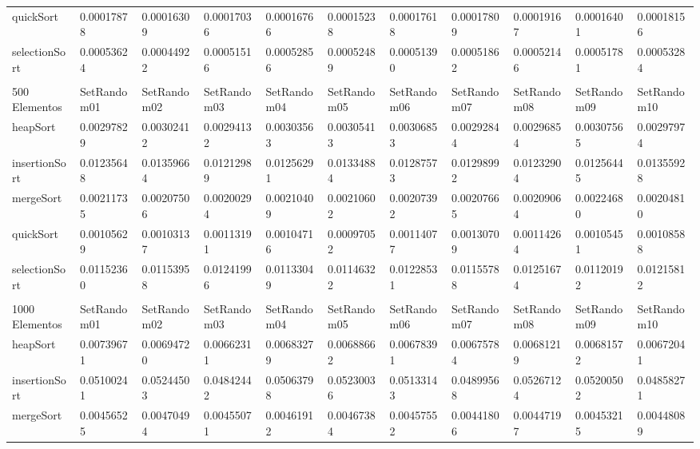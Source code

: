 \documentclass[article,a4paper]{article}
\begin{document}
\begin{table}[h]
{\begin{tabular}{lllllllllll}
quickSort       & 0.00017878  & 0.00016309  & 0.00017036  & 0.00016766  & 0.00015238  & 0.00017618  & 0.00017809  & 0.00019167  & 0.00016401  & 0.00018156  \\
selectionSort   & 0.00053624  & 0.00044922  & 0.00051516  & 0.00052856  & 0.00052489  & 0.00051390  & 0.00051862  & 0.00052146  & 0.00051781  & 0.00053284  \\
                &             &             &             &             &             &             &             &             &             &             \\
500 Elementos   & SetRandom01 & SetRandom02 & SetRandom03 & SetRandom04 & SetRandom05 & SetRandom06 & SetRandom07 & SetRandom08 & SetRandom09 & SetRandom10 \\
heapSort        & 0.00297829  & 0.00302412  & 0.00294132  & 0.00303563  & 0.00305413  & 0.00306853  & 0.00292844  & 0.00296854  & 0.00307565  & 0.00297974  \\
insertionSort   & 0.01235648  & 0.01359664  & 0.01212989  & 0.01256291  & 0.01334884  & 0.01287573  & 0.01298992  & 0.01232904  & 0.01256445  & 0.01355928  \\
mergeSort       & 0.00211735  & 0.00207506  & 0.00200294  & 0.00210409  & 0.00210602  & 0.00207392  & 0.00207665  & 0.00209064  & 0.00224680  & 0.00204810  \\
quickSort       & 0.00105629  & 0.00103137  & 0.00113191  & 0.00104716  & 0.00097052  & 0.00114077  & 0.00130709  & 0.00114264  & 0.00105451  & 0.00108588  \\
selectionSort   & 0.01152360  & 0.01153958  & 0.01241996  & 0.01133049  & 0.01146322  & 0.01228531  & 0.01155788  & 0.01251674  & 0.01120192  & 0.01215812  \\
                &             &             &             &             &             &             &             &             &             &             \\
1000 Elementos  & SetRandom01 & SetRandom02 & SetRandom03 & SetRandom04 & SetRandom05 & SetRandom06 & SetRandom07 & SetRandom08 & SetRandom09 & SetRandom10 \\
heapSort        & 0.00739671  & 0.00694720  & 0.00662311  & 0.00683279  & 0.00688662  & 0.00678391  & 0.00675784  & 0.00681219  & 0.00681572  & 0.00672041  \\
insertionSort   & 0.05100241  & 0.05244503  & 0.04842442  & 0.05063798  & 0.05230036  & 0.05133143  & 0.04899568  & 0.05267124  & 0.05200502  & 0.04858271  \\
mergeSort       & 0.00456525  & 0.00470494  & 0.00455071  & 0.00461912  & 0.00467384  & 0.00457552  & 0.00441806  & 0.00447197  & 0.00453215  & 0.00448089  \\

\end{tabular}}
\end{table}
\end{document}
